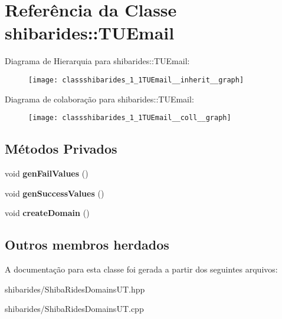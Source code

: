 \hypertarget{classshibarides_1_1TUEmail}{}\section{Referência da Classe shibarides\+:\+:T\+U\+Email}
\label{classshibarides_1_1TUEmail}


Diagrama de Hierarquia para shibarides\+:\+:T\+U\+Email\+:\nopagebreak
\begin{figure}[H]
\begin{center}
\leavevmode
\texttt{[image: classshibarides\_1\_1TUEmail\_\_inherit\_\_graph]}
\end{center}
\end{figure}


Diagrama de colaboração para shibarides\+:\+:T\+U\+Email\+:\nopagebreak
\begin{figure}[H]
\begin{center}
\leavevmode
\texttt{[image: classshibarides\_1\_1TUEmail\_\_coll\_\_graph]}
\end{center}
\end{figure}
\subsection*{Métodos Privados}
\begin{DoxyCompactItemize}
\item 
void {\bfseries gen\+Fail\+Values} ()\hypertarget{classshibarides_1_1TUEmail_ae68f0a3887b75afd3f6831b106377c76}{}\label{classshibarides_1_1TUEmail_ae68f0a3887b75afd3f6831b106377c76}

\item 
void {\bfseries gen\+Success\+Values} ()\hypertarget{classshibarides_1_1TUEmail_af23f030770895087069b469e02b81a9b}{}\label{classshibarides_1_1TUEmail_af23f030770895087069b469e02b81a9b}

\item 
void {\bfseries create\+Domain} ()\hypertarget{classshibarides_1_1TUEmail_a601c55dc1620c1f8ab997b0b18b32b0a}{}\label{classshibarides_1_1TUEmail_a601c55dc1620c1f8ab997b0b18b32b0a}

\end{DoxyCompactItemize}
\subsection*{Outros membros herdados}


A documentação para esta classe foi gerada a partir dos seguintes arquivos\+:\begin{DoxyCompactItemize}
\item 
shibarides/Shiba\+Rides\+Domains\+U\+T.\+hpp\item 
shibarides/Shiba\+Rides\+Domains\+U\+T.\+cpp\end{DoxyCompactItemize}
